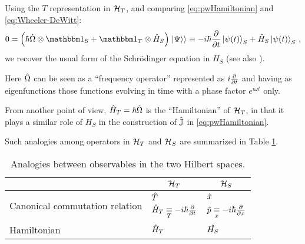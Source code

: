 Using the $T$ representation in $\hilb{H}_T$,
and comparing \eqref{eq:pwHamiltonian} and \eqref{eq:Wheeler-DeWitt}:
\begin{equation}\label{eq:schrod_from_pw}
  0 = \qty(\hbar\op{\Omega}\ox\idop_S + \idop_{T}\ox\op{H}_S)\dket{\Psi}
    \repr -i\hbar\pdv{t}\ket{\psi(t)}_{S} + \op{H}_S\ket{\psi(t)}_{S}
    \,\text{,}
\end{equation}
we recover the usual form of the Schr\"{o}dinger equation in $H_S$
(see also \cite[709--710]{Wootters:Loyola}).

Here $\op{\Omega}$ can be seen as a ``frequency operator''
represented as $i\pdv{t}$ and having as eigenfunctions
those functions evolving in time with a phase factor $e^{i \omega t}$ only.

From another point of view, $\op{H}_{T} = \hbar\op{\Omega}$ is the ``Hamiltonian'' of $\hilb{H}_T$,
in that it plays a similar role of $H_S$ in the construction of
$\op{\mathbb{J}}$ in \eqref{eq:pwHamiltonian}.

Such analogies among operators in $\hilb{H}_T$ and $\hilb{H}_S$ are summarized in Table \ref{tbl:op_comparison_pw}.

{
  \begin{table}
    \centering
    \begin{tabular}{l|l|l}
      & \multicolumn{1}{c|}{$\hilb{H}_T$}                 & \multicolumn{1}{|c}{$\hilb{H}_S$}       \\
      \hline
      \multirow{2}{11em}{Canonical commutation relation}
      & $\op{T}$                                          & $\op{x}$                            \\
      & $\op{H}_T \repr[T] -i\hbar\pdv{t} $  & $\op{p} \repr[x] -i\hbar\pdv{x}$       \\
      \hline
      Hamiltonian
      & $\op{H}_T$                                        & $\op{H_S}$
    \end{tabular}
    {\caption{
      Analogies between observables in the two Hilbert spaces.
    }\label{tbl:op_comparison_pw}}
  \end{table}
}


